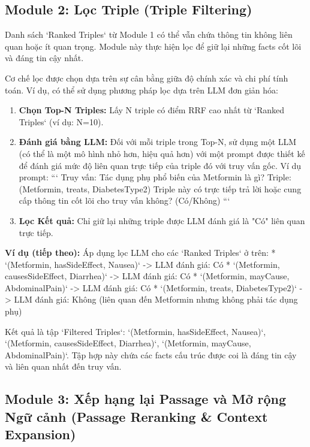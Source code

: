 \documentclass[../main.tex]{subfiles}
\begin{document}
\subsection{Module 2: Lọc Triple (Triple Filtering)}

Danh sách `Ranked Triples` từ Module 1 có thể vẫn chứa thông tin không liên quan hoặc ít quan trọng. Module này thực hiện lọc để giữ lại những facts cốt lõi và đáng tin cậy nhất.

Cơ chế lọc được chọn dựa trên sự cân bằng giữa độ chính xác và chi phí tính toán. Ví dụ, có thể sử dụng phương pháp lọc dựa trên LLM đơn giản hóa:

\begin{enumerate}
    \item \textbf{Chọn Top-N Triples:} Lấy N triple có điểm RRF cao nhất từ `Ranked Triples` (ví dụ: N=10).
    \item \textbf{Đánh giá bằng LLM:} Đối với mỗi triple trong Top-N, sử dụng một LLM (có thể là một mô hình nhỏ hơn, hiệu quả hơn) với một prompt được thiết kế để đánh giá mức độ liên quan trực tiếp của triple đó với truy vấn gốc. Ví dụ prompt:
        ```
        Truy vấn: Tác dụng phụ phổ biến của Metformin là gì?
        Triple: (Metformin, treats, DiabetesType2)
        Triple này có trực tiếp trả lời hoặc cung cấp thông tin cốt lõi cho truy vấn không? (Có/Không)
        ```
    \item \textbf{Lọc Kết quả:} Chỉ giữ lại những triple được LLM đánh giá là "Có" liên quan trực tiếp.
\end{enumerate}

\textbf{Ví dụ (tiếp theo):}
Áp dụng lọc LLM cho các `Ranked Triples` ở trên:
*   `(Metformin, hasSideEffect, Nausea)` -> LLM đánh giá: Có
*   `(Metformin, causesSideEffect, Diarrhea)` -> LLM đánh giá: Có
*   `(Metformin, mayCause, AbdominalPain)` -> LLM đánh giá: Có
*   `(Metformin, treats, DiabetesType2)` -> LLM đánh giá: Không (liên quan đến Metformin nhưng không phải tác dụng phụ)

Kết quả là tập `Filtered Triples`: {`(Metformin, hasSideEffect, Nausea)`, `(Metformin, causesSideEffect, Diarrhea)`, `(Metformin, mayCause, AbdominalPain)`}. Tập hợp này chứa các facts cấu trúc được coi là đáng tin cậy và liên quan nhất đến truy vấn.

\subsection{Module 3: Xếp hạng lại Passage và Mở rộng Ngữ cảnh (Passage Reranking \& Context Expansion)}
\end{document}
